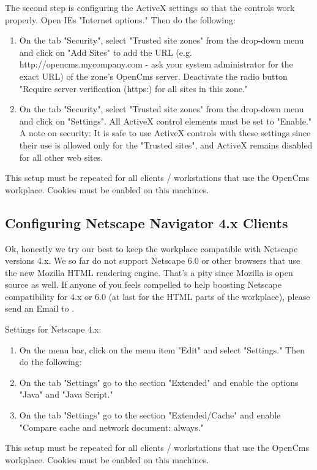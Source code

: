 The second step is configuring the ActiveX settings so that the
controls work properly. Open IEs "Internet options." Then do the
following:

\begin{enumerate}
\item On the tab "Security", select "Trusted site zones" from the
drop-down menu and click on "Add Sites" to add the URL (e.g.
http://opencms.mycompany.com - ask your system administrator for
the exact URL) of the zone's OpenCms server. Deactivate the radio
button "Require server verification (https:) for all sites in this
zone."
\item On the tab "Security", select "Trusted site zones"
from the drop-down menu and click on "Settings". All ActiveX
control elements must be set to "Enable." A note on security: It
is safe to use ActiveX controls with these settings since their
use is allowed only for the "Trusted sites", and ActiveX remains
disabled for all other web sites.
\end{enumerate}

This setup must be repeated for all clients / workstations that
use the OpenCms workplace. Cookies must be enabled on this
machines.


\subsection{Configuring Netscape Navigator 4.x Clients}

Ok, honestly we try our best to keep the workplace compatible with
Netscape versions 4.x. We so far do not support Netscape 6.0 or
other browsers that use the new Mozilla HTML rendering engine.
That's a pity since Mozilla is open source as well. If anyone of
you feels compelled to help boosting Netscape compatibility for
4.x or 6.0 (at last for the HTML parts of the workplace), please
send an Email to
.

Settings for Netscape 4.x:
\begin{enumerate}
\item On the menu bar, click on the menu item "Edit" and select
"Settings." Then do the following:
\item On the tab "Settings" go
to the section "Extended" and enable the options "Java" and "Java
Script."
\item On the tab "Settings" go to the section
"Extended/Cache" and enable "Compare cache and network document:
always."
\end{enumerate}

This setup must be repeated for all clients / workstations that
use the OpenCms workplace. Cookies must be enabled on this
machines.
